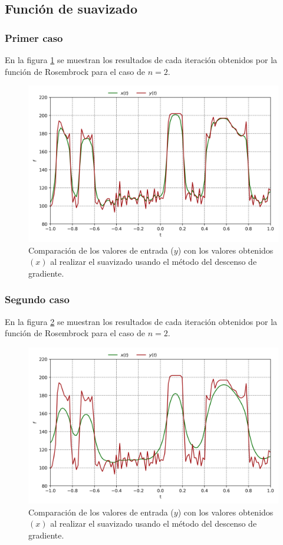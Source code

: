 
\subsection{Función de suavizado}

\subsubsection{Primer caso}

En la figura \ref{fig:lambda_1} se muestran los resultados de cada iteración obtenidos por la función de Rosembrock para el caso de $n=2$.

\begin{figure}[H]
    \centering
    \includegraphics[width=12cm]{Graphics/Problema_3/lambda_1.png}
    \caption{Comparación de los valores de entrada ($y$) con los valores obtenidos $(x)$ al realizar el suavizado usando el método del descenso de gradiente.}
    \label{fig:lambda_1}
\end{figure}


\subsubsection{Segundo caso}

En la figura \ref{fig:lambda_10} se muestran los resultados de cada iteración obtenidos por la función de Rosembrock para el caso de $n=2$.

\begin{figure}[H]
    \centering
    \includegraphics[width=12cm]{Graphics/Problema_3/lambda_10.png}
    \caption{Comparación de los valores de entrada ($y$) con los valores obtenidos $(x)$ al realizar el suavizado usando el método del descenso de gradiente.}
    \label{fig:lambda_10}
\end{figure}

